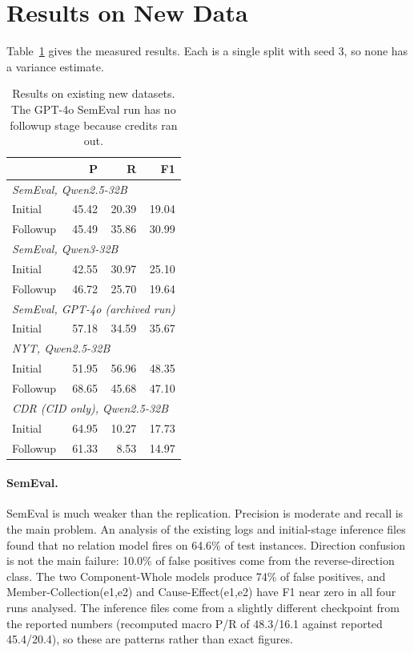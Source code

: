 \section{Results on New Data}
\label{sec:newresults}

Table~\ref{tab:newresults} gives the measured results. Each is a single split with seed 3, so none has a variance estimate.

\begin{table}[t]
\centering\small
\begin{tabular}{lrrr}
\toprule
 & P & R & F1 \\
\midrule
\multicolumn{4}{l}{\emph{SemEval, Qwen2.5-32B}} \\
Initial & 45.42 & 20.39 & 19.04 \\
Followup & 45.49 & 35.86 & 30.99 \\
\multicolumn{4}{l}{\emph{SemEval, Qwen3-32B}} \\
Initial & 42.55 & 30.97 & 25.10 \\
Followup & 46.72 & 25.70 & 19.64 \\
\multicolumn{4}{l}{\emph{SemEval, GPT-4o (archived run)}} \\
Initial & 57.18 & 34.59 & 35.67 \\
\multicolumn{4}{l}{\emph{NYT, Qwen2.5-32B}} \\
Initial & 51.95 & 56.96 & 48.35 \\
Followup & 68.65 & 45.68 & 47.10 \\
\multicolumn{4}{l}{\emph{CDR (CID only), Qwen2.5-32B}} \\
Initial & 64.95 & 10.27 & 17.73 \\
Followup & 61.33 & 8.53 & 14.97 \\
\bottomrule
\end{tabular}
\caption{Results on existing new datasets. The GPT-4o SemEval run has no followup stage because credits ran out.}
\label{tab:newresults}
\end{table}

\paragraph{SemEval.} SemEval is much weaker than the replication. Precision is moderate and recall is the main problem. An analysis of the existing logs and initial-stage inference files found that no relation model fires on 64.6\% of test instances. Direction confusion is not the main failure: 10.0\% of false positives come from the reverse-direction class. The two Component-Whole models produce 74\% of false positives, and Member-Collection(e1,e2) and Cause-Effect(e1,e2) have F1 near zero in all four runs analysed. The inference files come from a slightly different checkpoint from the reported numbers (recomputed macro P/R of 48.3/16.1 against reported 45.4/20.4), so these are patterns rather than exact figures.

